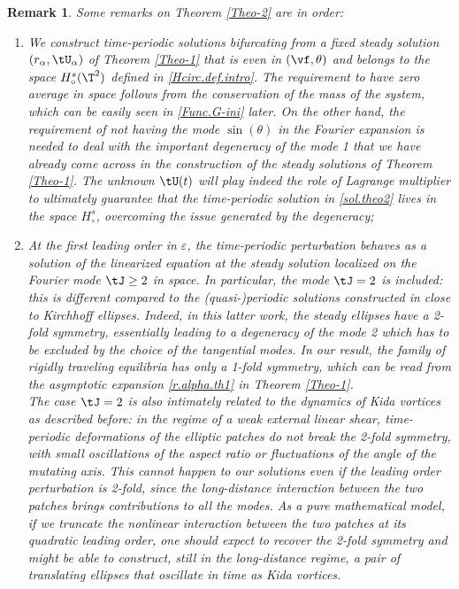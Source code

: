 \documentclass[a4paper,reqno,10pt]{article}
\newtheorem{rem}{Remark}[section]
\begin{document}
\begin{rem}\label{remark.theo2}
Some remarks on Theorem \ref{Theo-2} are in order:
\begin{enumerate}[label=(\roman*)]
    \item We construct time-periodic solutions bifurcating from a fixed  steady solution $(r_\alpha,\tU_{\alpha})$ of Theorem \ref{Theo-1} that is even in $(\vf,\theta)$ and belongs to the space $H_\circ^s(\T^2)$ defined in \eqref{Hcirc.def.intro}. The requirement to have zero average in space follows from the conservation of the mass of the system, which can be easily seen in \eqref{Func.G-ini} later. On the other hand, the requirement of not having the mode $\sin(\theta)$ in the Fourier expansion is needed to deal with the important degeneracy of the mode 1 that we have already come across in the construction of the steady solutions of Theorem \ref{Theo-1}. The unknown $\tU(t)$ will play indeed the role of Lagrange multiplier to ultimately guarantee that the  time-periodic solution  in \eqref{sol.theo2} lives in the space $H_\circ^s$, overcoming the issue generated by the degeneracy;
\item At the first leading order in $\varepsilon$, the time-periodic perturbation behaves as a solution of the linearized equation at the steady solution localized on the Fourier mode $\tJ\geq 2$ in space. In particular, the mode $\tJ=2$ is included: this is different compared to the (quasi-)periodic solutions constructed in \cite{BHM23} close to Kirchhoff ellipses. Indeed, in this latter work, the steady ellipses have a 2-fold symmetry, essentially leading to a degeneracy of the mode 2 which has to be excluded by the choice of the tangential modes. In our result, the family of rigidly traveling equilibria has only a 1-fold symmetry, which can be read from the asymptotic expansion \eqref{r.alpha.th1} in Theorem \ref{Theo-1}. \\
The case $\tJ=2$ is also intimately related to the dynamics of Kida vortices \cite{Kida} as described before: in the regime of a weak external linear shear, time-periodic deformations of the elliptic patches do not break the 2-fold symmetry, with small oscillations of the aspect ratio or fluctuations of the angle of the mutating axis. This cannot happen to our solutions even if the leading order perturbation is 2-fold, since the long-distance interaction between the two patches brings contributions to all the modes. As a pure mathematical model, if we truncate the nonlinear interaction between the two patches at its quadratic leading order, one should expect to recover the 2-fold symmetry and might be able to construct, still in the long-distance regime, a pair of translating ellipses that oscillate in time as Kida vortices. \\

\end{enumerate}
\end{rem}
\end{document}
